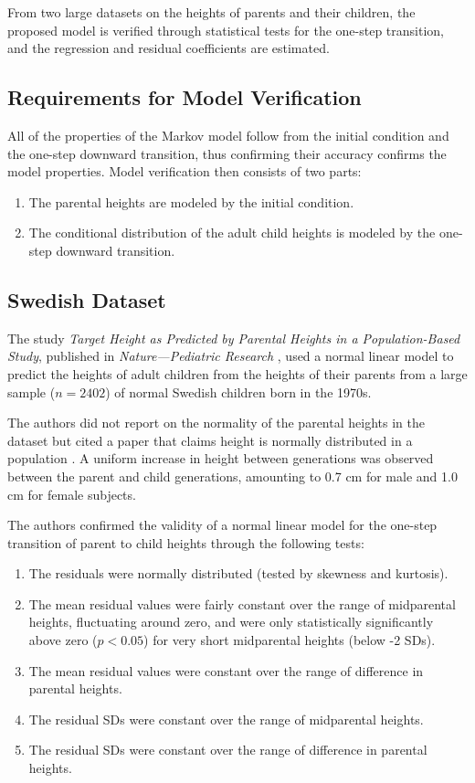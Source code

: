 \documentclass{svproc} %
\begin{document}
From two large datasets on the heights of parents and their children, the proposed model is verified through statistical tests for the one-step transition, and the regression and residual coefficients are estimated.

\subsection{Requirements for Model Verification} \label{verify}

All of the properties of the Markov model follow from the initial condition and the one-step downward transition, thus confirming their accuracy confirms the model properties. Model verification then consists of two parts:
\begin{enumerate}
\item The parental heights are modeled by the initial condition.
\item The conditional distribution of the adult child heights is modeled by the one-step downward transition.
\end{enumerate}



\subsection{Swedish Dataset}

The study \emph{Target Height as Predicted by Parental Heights in a Population-Based Study}, published in \emph{Nature---Pediatric Research} \cite{luo}, used a normal linear model to predict the heights of adult children from the heights of their parents from a large sample ($n = 2402$) of normal Swedish children born in the 1970s. 

The authors did not report on the normality of the parental heights in the dataset but cited a paper that claims height is normally distributed in a population \cite{preece}. A uniform increase in height between generations was observed between the parent and child generations, amounting to 0.7 cm for male and 1.0 cm for female subjects. 

The authors confirmed the validity of a normal linear model for the one-step transition of parent to child heights through the following tests:
\begin{enumerate}
\item The residuals were normally distributed (tested by skewness and kurtosis).
\item The mean residual values were fairly constant over the range of midparental heights, fluctuating around zero, and were only statistically significantly above zero ($p < 0.05$) for very short midparental heights (below -2 SDs).
\item The mean residual values were constant over the range of difference in parental heights.
\item The residual SDs were constant over the range of midparental heights.
\item The residual SDs were constant over the range of difference in parental heights.
\end{enumerate}
\end{document}
